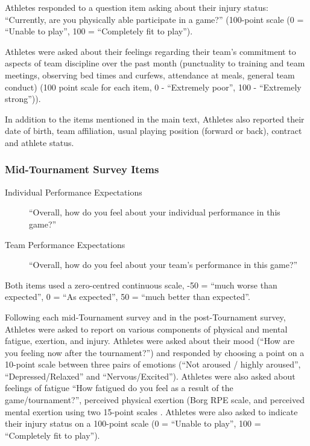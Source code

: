 Athletes responded to a question item asking about their injury status: ``Currently, are you physically able participate in a game?'' (100-point scale (0 = ``Unable to play'', 100 = ``Completely fit to play'').

Athletes were asked about their feelings regarding their team's commitment to aspects of team discipline over the past month (punctuality to training and team meetings, observing bed times and curfews, attendance at meals, general team conduct) (100 point scale for each item, 0 - ``Extremely poor'', 100 - ``Extremely strong'')).


In addition to the items mentioned in the main text, Athletes also reported their date of birth, team affiliation, usual playing position (forward or back), contract and athlete status.






\subsubsection{Mid-Tournament Survey Items\label{app8:surveyMid}}

\begin{description}
\item [Individual Performance Expectations]``Overall, how do you feel about your individual performance in this game?''
\item [Team Performance Expectations] ``Overall, how do you feel about your team's performance in this game?''
\end{description}
Both items used a zero-centred continuous scale, -50 = ``much worse than expected'', 0 =  ``As expected'', 50 =  ``much better than expected''.

Following each mid-Tournament survey and in the post-Tournament survey, Athletes were asked to report on various components of physical and mental fatigue, exertion, and injury. Athletes were asked about their mood (``How are you feeling now after the tournament?'') and responded by choosing a point on a 10-point scale between three pairs of emotions (``Not aroused / highly aroused'',  ``Depressed/Relaxed'' and  ``Nervous/Excited'').  Athletes were also asked about feelings of fatigue ``How fatigued do you feel as a result of the game/tournament?'', perceived physical exertion (Borg RPE scale, \citep{Borg1990} and perceived mental exertion using two 15-point scales \citep[see][ ]{Noakes2012a}.  Athletes were also asked to indicate their injury status on a 100-point scale (0 = ``Unable to play'', 100 = ``Completely fit to play'').




